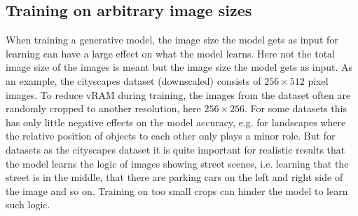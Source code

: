 \subsection{Training on arbitrary image sizes} %
When training a generative model, the image size the model gets as input for learning can have a large effect on what the model learns. Here not the total image size of the images is meant but the image size the model gets as input. As an example, the cityscapes dataset (downscaled) consists of $256\times512$ pixel images. To reduce vRAM during training, the images from the dataset often are randomly cropped to another resolution, here $256\times256$. For some datasets this has only little negative effects on the model accuracy, e.g. for landscapes where the relative position of objects to each other only plays a minor role. But for datasets as the cityscapes dataset it is quite important for realistic results that the model learns the logic of images showing street scenes, i.e. learning that the street is in the middle, that there are parking cars on the left and right side of the image and so on. Training on too small crops can hinder the model to learn such logic.


